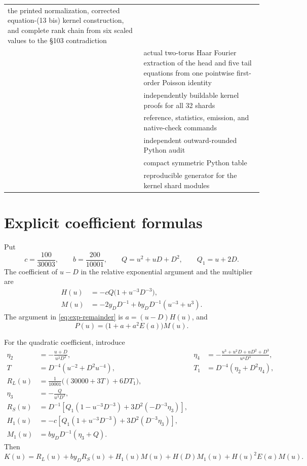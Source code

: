 \documentclass[11pt]{article}
\begin{document}
\begin{center}
\begin{tabular}{L{0.43\textwidth}L{0.48\textwidth}}
the printed normalization, corrected equation-(13 bis) kernel construction, and complete rank
chain from six scaled values to the \S103 contradiction\\
 & actual two-torus Haar Fourier extraction of the head
and five tail equations from one pointwise first-order Poisson identity\\
 & independently buildable kernel proofs for all 32
shards\\
 & reference, statistics, emission, and native-check
commands\\
 & independent outward-rounded Python audit\\
 & compact symmetric Python table\\
 & reproducible generator for the
kernel shard modules\\
\bottomrule
\end{tabular}
\end{center}

\appendix
\section{Explicit coefficient formulas}\label{sec:formulas}

Put
\[
 c=\frac{100}{30003},\qquad b=\frac{200}{10001},\qquad
 Q=u^2+uD+D^2,\qquad Q_1=u+2D.
\]
The coefficient of \(u-D\) in the relative exponential argument and the multiplier are
\begin{align*}
 H(u)&=-cQ\bigl(1+u^{-3}D^{-3}\bigr),\\
 M(u)&=-2y_DD^{-1}+by_DD^{-1}(u^{-3}+u^3).
\end{align*}
The argument in \eqref{eq:exp-remainder} is \(a=(u-D)H(u)\), and
\[
 P(u)=\bigl(1+a+a^2E(a)\bigr)M(u).
\]

For the quadratic coefficient, introduce
\begin{align*}
 \eta_2&=-\frac{u+D}{u^2D^2},&
 \eta_4&=-\frac{u^3+u^2D+uD^2+D^3}{u^4D^4},\\
 T&=D^{-4}(u^{-2}+D^2u^{-4}),&
 T_1&=D^{-4}(\eta_2+D^2\eta_4),\\
 R_L(u)&=\frac1{10001}\bigl((30000+3T)+6DT_1\bigr),\\
 \eta_3&=-\frac{Q}{u^3D^3},\\
 R_S(u)&=D^{-1}\left[Q_1(1-u^{-3}D^{-3})
      +3D^2(-D^{-3}\eta_3)\right],\\
 H_1(u)&=-c\left[Q_1(1+u^{-3}D^{-3})+3D^2(D^{-3}\eta_3)\right],\\
 M_1(u)&=by_DD^{-1}(\eta_3+Q).
\end{align*}
Then
\[
 K(u)=R_L(u)+by_DR_S(u)+H_1(u)M(u)+H(D)M_1(u)+H(u)^2E(a)M(u).
\]
\end{document}
